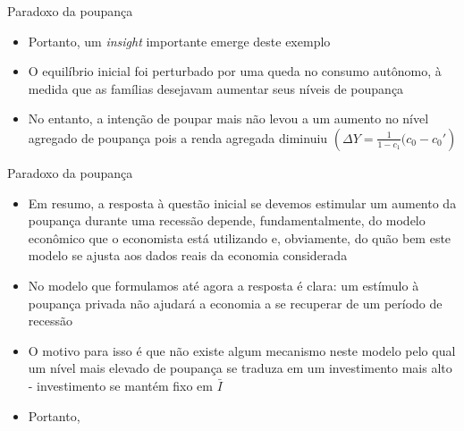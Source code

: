 \documentclass[10pt]{beamer}
\begin{document}
\begin{frame}{Paradoxo da poupança}
    \begin{itemize}
        \item Portanto, um \emph{insight} importante emerge deste exemplo\bigskip

        \item O equilíbrio inicial foi perturbado por uma queda no consumo autônomo, à medida que as famílias desejavam aumentar seus níveis de poupança\bigskip

        \item No entanto, a intenção de poupar mais não levou a um aumento no nível agregado de poupança pois a renda agregada diminuiu $\left(\Delta Y = \frac{1}{1-c_1}(c_0-c_0'\right)$\bigskip

    \end{itemize}
\end{frame}

\begin{frame}{Paradoxo da poupança}
    \begin{itemize}
        \item Em resumo, a resposta à questão inicial se devemos estimular um aumento da poupança durante uma recessão depende, fundamentalmente, do modelo econômico que o economista está utilizando e, obviamente, do quão bem este modelo se ajusta aos dados reais da economia considerada\bigskip

        \item No modelo que formulamos até agora a resposta é clara: um estímulo à poupança privada não ajudará a economia a se recuperar de um período de recessão\bigskip

        \item O motivo para isso é que não existe algum mecanismo neste modelo pelo qual um nível mais elevado de poupança se traduza em um investimento mais alto - investimento se mantém fixo em $\bar{I}$\bigskip

        \item Portanto, 
    \end{itemize}
\end{frame}
\end{document}
